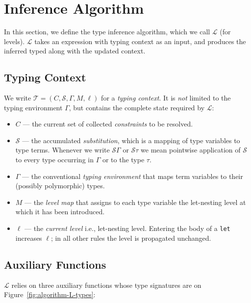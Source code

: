 \section{Inference Algorithm}

In this section, we define the type inference algorithm, which we call $\mathcal{L}$ (for levels). $\mathcal{L}$ takes an expression with typing context as an input, and produces the inferred typed along with the updated context.

\subsection{Typing Context}

We write $\mathcal{T} = (C, \mathcal{S}, \Gamma, M, \ell)$ for a \emph{typing context}. It is \emph{not} limited to the typing environment \(\Gamma\), but contains the complete state required by $\mathcal{L}$:
\begin{itemize}
  \item $C$ — the current set of collected \emph{constraints} to be resolved.
  \item $\mathcal{S}$ — the accumulated \emph{substitution}, which is a mapping of type variables to type terms.  Whenever we write $\mathcal{S}\Gamma$ or $\mathcal{S}\tau$ we mean pointwise application of $\mathcal{S}$ to every type occurring in $\Gamma$ or to the type $\tau$.
  \item $\Gamma$ — the conventional \emph{typing environment} that maps term variables to their (possibly polymorphic) types.
  \item $M$ — the \emph{level map} that assigns to each type variable the let-nesting level at which it has been introduced.
  \item $\ell$ — the \emph{current level} i.e., let-nesting level. Entering the body of a \texttt{let} increases $\ell$; in all other rules the level is propagated unchanged.
\end{itemize}

\subsection{Auxiliary Functions}

$\mathcal{L}$ relies on three auxiliary functions whose type signatures are on Figure~\ref{fig:algorithm-L-types}:

